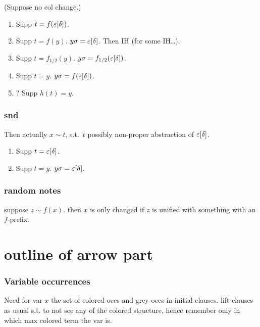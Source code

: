 \documentclass[,%
	paper=a4,%
	DIV11, %
	twoside=false,%
	liststotoc,
	bibtotoc,
	draft=false,%
	numbers=noendperiod
]{scrartcl}
\begin{document}
(Suppose no col change.)

\begin{enumerate}
	\item Supp $t = f(\varepsilon[\delta])$. \checkmark
	\item Supp $t = f(y)$.
		$y\sigma = \varepsilon[\delta]$.
		Then IH (for some IH\dots).
	\item Supp $t = f_{1/2}(y)$.
		$y\sigma = f_{1/2}(\varepsilon[\delta])$.
	\item Supp $t = y$.
		$y\sigma = f(\varepsilon[\delta])$.
	\item ? Supp $h(t) = y$.
\end{enumerate}

\subsection{snd}

Then actually $x \sim t$, s.t.\ $t$ possibly non-proper abstraction of $\varepsilon[\delta]$.

\begin{enumerate}
	\item Supp $t = \varepsilon[\delta]$. \checkmark
	\item Supp $t = y$.
		$y\sigma = \varepsilon[\delta]$.
\end{enumerate}

\subsection{random notes}

suppose $z\sim f(x)$.
then $x$ is only changed if $z$ is unified with something with an $f$-prefix.




\chapter{outline of arrow part}


\subsection{Variable occurrences}
Need for var $x$ the set of colored occs and grey occs in initial clauses.
lift clauses as usual s.t. to not see any of the colored structure, hence remember only in which max colored term the var is.
\end{document}
